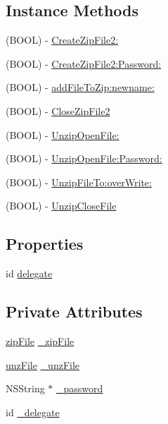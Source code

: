 \subsection*{Instance Methods}
\begin{DoxyCompactItemize}
\item 
(B\+O\+O\+L) -\/ \hyperlink{interface_zip_archive_a70358b00d370617ce3102d40e6102e92}{Create\+Zip\+File2\+:}
\item 
(B\+O\+O\+L) -\/ \hyperlink{interface_zip_archive_a74d2947f6a62a240c8f42f0a0dfc9233}{Create\+Zip\+File2\+:\+Password\+:}
\item 
(B\+O\+O\+L) -\/ \hyperlink{interface_zip_archive_a170c8ef05dd74baa486e1e5569f56f21}{add\+File\+To\+Zip\+:newname\+:}
\item 
(B\+O\+O\+L) -\/ \hyperlink{interface_zip_archive_a94f65b610c1e6b225c1df35adfa7a47b}{Close\+Zip\+File2}
\item 
(B\+O\+O\+L) -\/ \hyperlink{interface_zip_archive_aa4f284add191dc8f72575e393ff27c20}{Unzip\+Open\+File\+:}
\item 
(B\+O\+O\+L) -\/ \hyperlink{interface_zip_archive_a0e1d98b7cbb21c7282009fb461a72122}{Unzip\+Open\+File\+:\+Password\+:}
\item 
(B\+O\+O\+L) -\/ \hyperlink{interface_zip_archive_ad79876ed74b33c3878575e223b7dcd92}{Unzip\+File\+To\+:over\+Write\+:}
\item 
(B\+O\+O\+L) -\/ \hyperlink{interface_zip_archive_a678227669d26b01622ff61be7b68e65b}{Unzip\+Close\+File}
\end{DoxyCompactItemize}
\subsection*{Properties}
\begin{DoxyCompactItemize}
\item 
id \hyperlink{interface_zip_archive_a072993638f1440f3781868317f8cb97c}{delegate}
\end{DoxyCompactItemize}
\subsection*{Private Attributes}
\begin{DoxyCompactItemize}
\item 
\hyperlink{zip_8h_af69b9a5ea9aaf8e8f0b7681e451b224c}{zip\+File} \hyperlink{interface_zip_archive_aef981226e267166499dd00261da48a11}{\+\_\+zip\+File}
\item 
\hyperlink{unzip_8h_ad578db1d36691a2a244482a3b2360ca3}{unz\+File} \hyperlink{interface_zip_archive_aef1fdacfc0ed02ab4735cbc1f631ad22}{\+\_\+unz\+File}
\item 
N\+S\+String $\ast$ \hyperlink{interface_zip_archive_a1f6e0549b26a0e884755801f9e67a6c1}{\+\_\+password}
\item 
id \hyperlink{interface_zip_archive_a0e59d1e68fc368e3489bae0c94862032}{\+\_\+delegate}
\end{DoxyCompactItemize}


